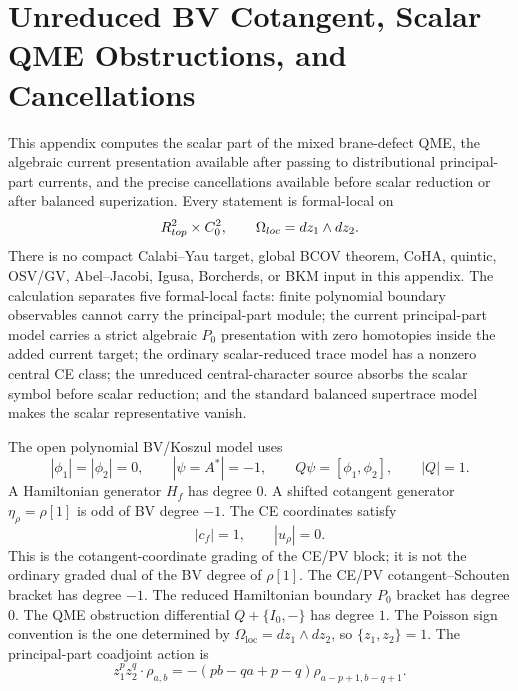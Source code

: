 \section{Unreduced BV Cotangent, Scalar QME Obstructions, and Cancellations}
\label{sec:app-unreduced-bv-qme}

This appendix computes the scalar part of the mixed brane-defect QME,
the algebraic current presentation available after passing to
distributional principal-part currents, and the precise cancellations
available before scalar reduction or after balanced superization.  Every
statement is formal-local on
\[
  R^2_{top}\times C^2_0,
  \qquad
  \Omega_{loc}=dz_1\wedge dz_2 .
\]
There is no compact Calabi--Yau target, global BCOV theorem, CoHA,
quintic, OSV/GV, Abel--Jacobi, Igusa, Borcherds, or BKM input in this
appendix.  The calculation separates five formal-local facts: finite
polynomial boundary observables cannot carry the principal-part module;
the current principal-part model carries a strict algebraic \(P_0\)
presentation with zero homotopies inside the added current target; the
ordinary scalar-reduced trace model has a nonzero central CE class; the
unreduced central-character source absorbs the scalar symbol before
scalar reduction; and the standard balanced supertrace model makes the
scalar representative vanish.

\begin{defn}
\label{def:app-unreduced-bv-degrees}
  The open polynomial BV/Koszul model uses
  \[
    |\phi_1|=|\phi_2|=0,\qquad |\psi=A^*|=-1,\qquad
    Q\psi=[\phi_1,\phi_2],\qquad |Q|=1 .
  \]
  A Hamiltonian generator \(H_f\) has degree \(0\).  A shifted cotangent
  generator \(\eta_\rho=\rho[1]\) is odd of BV degree \(-1\).  The CE
  coordinates satisfy
  \[
    |c_f|=1,\qquad |u_\rho|=0 .
  \]
  This is the cotangent-coordinate grading of the CE/PV block; it is
  not the ordinary graded dual of the BV degree of \(\rho[1]\).  The
  CE/PV cotangent--Schouten bracket has degree \(-1\).  The reduced
  Hamiltonian boundary \(P_0\) bracket has degree \(0\).  The QME
  obstruction differential \(Q+\{I_0,-\}\) has degree \(1\).  The
  Poisson sign convention is the one determined by
  \(\Omega_{\mathrm{loc}}=dz_1\wedge dz_2\), so
  \(\{z_1,z_2\}=1\).  The principal-part coadjoint action is
  \[
    z_1^p z_2^q\cdot\rho_{a,b}
    =
    -(pb-qa+p-q)\rho_{a-p+1,b-q+1}.
  \]
\end{defn}

